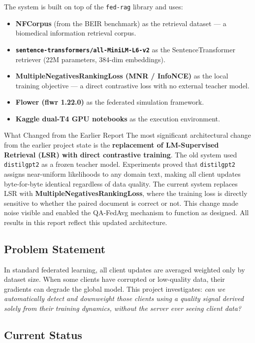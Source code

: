 \documentclass[12pt,a4paper]{article}
\begin{document}
The system is built on top of the \texttt{fed-rag} library and uses:
\begin{itemize}
  \item \textbf{NFCorpus} (from the BEIR benchmark) as the retrieval dataset --- a biomedical information retrieval corpus.
  \item \textbf{\texttt{sentence-transformers/all-MiniLM-L6-v2}} as the SentenceTransformer retriever (22M parameters, 384-dim embeddings).
  \item \textbf{MultipleNegativesRankingLoss (MNR / InfoNCE)} as the local training objective --- a direct contrastive loss with no external teacher model.
  \item \textbf{Flower (flwr 1.22.0)} as the federated simulation framework.
  \item \textbf{Kaggle dual-T4 GPU notebooks} as the execution environment.
\end{itemize}

\begin{warnbox}{What Changed from the Earlier Report}
  The most significant architectural change from the earlier project state is the \textbf{replacement of LM-Supervised Retrieval (LSR) with direct contrastive training}. The old system used \texttt{distilgpt2} as a frozen teacher model. Experiments proved that \texttt{distilgpt2} assigns near-uniform likelihoods to any domain text, making all client updates byte-for-byte identical regardless of data quality. The current system replaces LSR with \textbf{MultipleNegativesRankingLoss}, where the training loss is directly sensitive to whether the paired document is correct or not. This change made noise visible and enabled the QA-FedAvg mechanism to function as designed. All results in this report reflect this updated architecture.
\end{warnbox}

\subsection{Problem Statement}

In standard federated learning, all client updates are averaged weighted only by dataset size. When some clients have corrupted or low-quality data, their gradients can degrade the global model. This project investigates: \textit{can we automatically detect and downweight those clients using a quality signal derived solely from their training dynamics, without the server ever seeing client data?}

\subsection{Current Status}
\end{document}
